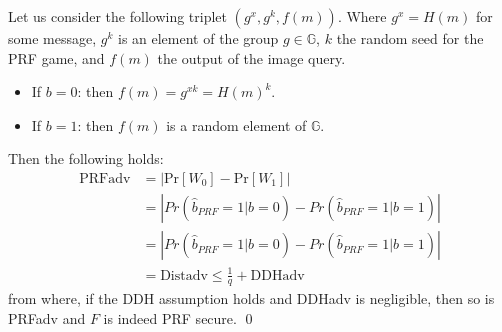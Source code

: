 Let us consider the following triplet $(g^{x},g^{k}, f(m))$.
Where $g^{x}=H(m)$ for some message, $g^{k}$ is an element of the group $g\in\mathbb{G}$, $k$ the random seed for the PRF game, and $f(m)$ the output of the image query.
\begin{itemize}
    \item If $b = 0$: then $f(m) = g^{xk} = H(m)^k$. 
    \item If $b = 1$: then $f(m)$ is a random element of $\mathbb{G}$.
\end{itemize}
Then the following holds:
\begin{equation*}
    \begin{split}
        \text{PRFadv} & = \left\vert \text{Pr}[W_0] - \text{Pr}[W_1] \right\vert \\
            & = \left\vert Pr(\hat{b}_{PRF} = 1 | b = 0) - Pr(\hat{b}_{PRF} = 1 | b = 1)\right\vert \\
            & = \left\vert Pr(\hat{b}_{PRF} = 1 | b = 0) - Pr(\hat{b}_{PRF} = 1 | b = 1)\right\vert \\
            & = \text{Distadv} \leq \frac{1}{q} + \text{DDHadv}
    \end{split}
\end{equation*}
from where, if the DDH assumption holds and DDHadv is negligible, then so is PRFadv and $F$ is indeed PRF secure. \hfill \qed

%
%
%
%
%
%

